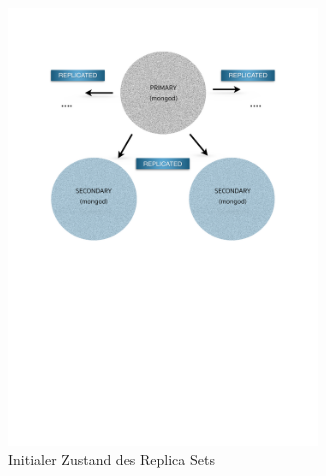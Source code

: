\begin{figure}[H]
   \begin{subfigure}[t]{0.49\textwidth}\vspace{0pt}
   \centering
      \includegraphics[trim = 28mm 139mm 28mm 29mm, clip, width=0.9\textwidth]{resources/replicaSet/createReplicaSet2}
      \caption[Initialer Zustand des Replica Sets]{Initialer Zustand des Replica Sets}
      \label{img:createReplicaSet}
   \end{subfigure}\hfill%
   \begin{subfigure}[t]{0.49\textwidth}\vspace{0pt}
   \centering

\end{subfigure}
\end{figure}
